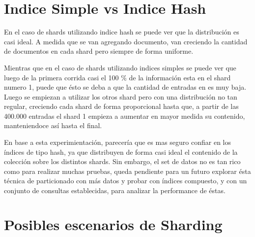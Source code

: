 \documentclass[a4paper, 10pt, twoside]{article}
\begin{document}
\section{Indice Simple vs Indice Hash}

En el caso de shards utilizando indice hash se puede ver que la distribuci\'on es
casi ideal. A medida que se van agregando documento, van creciendo la cantidad de documentos en
cada shard pero siempre de forma uniforme. 

Mientras que en el caso de shards utilizando
indices simples se puede ver que luego de la primera corrida casi el 100 \% de la informaci\'on esta
en el shard numero 1, puede que \'esto se deba  a que la cantidad de entradas en es muy baja.
Luego se empiezan a utilizar los otros shard pero con una distribuci\'on no
tan regular, creciendo cada shard de forma proporcional hasta que, a partir de las 400.000 entradas el shard 1 empieza a aumentar en mayor medida su contenido, manteniendoce as\'i hasta el final.

En base a esta experimientaci\'on, parecer\'ia que es mas seguro confiar en los \'indices de tipo hash, ya que distribuyen de forma casi ideal el contenido de la colecci\'on sobre los distintos shards. Sin embargo, el set de datos no es tan rico como para realizar muchas pruebas, queda pendiente para un futuro explorar \'esta t\'ecnica de particionado con m\'as datos y probar con \'indices compuesto, y con un conjunto de consultas establecidas, para analizar la performance de \'estas.

\section{Posibles escenarios de Sharding}
\end{document}
